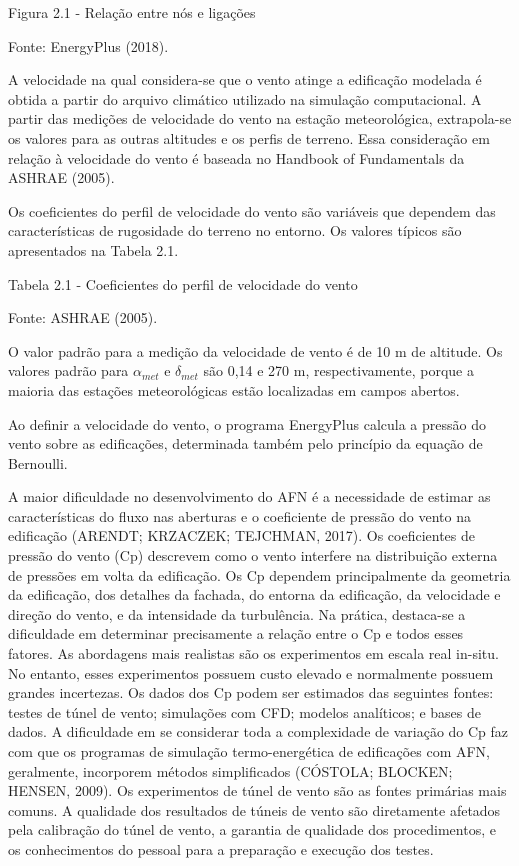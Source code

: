 \documentclass[brazil,hardcopy,openany,a5paper]{ufscthesis}
\begin{document}
	Figura 2.1 - Relação entre nós e ligações
	
	Fonte: EnergyPlus (2018).
	
	A velocidade na qual considera-se que o vento atinge a edificação modelada é obtida a partir do arquivo climático utilizado na simulação
	computacional. A partir das medições de velocidade do vento na estação meteorológica, extrapola-se os valores para as outras altitudes e os perfis de terreno. Essa consideração em relação à velocidade do vento é baseada no
	Handbook of Fundamentals da ASHRAE (2005).
	
	Os coeficientes do perfil de velocidade do vento são variáveis que dependem das características de rugosidade do terreno no entorno. Os valores típicos são apresentados na Tabela 2.1.
	
	Tabela 2.1 - Coeficientes do perfil de velocidade do vento 
	
	Fonte: ASHRAE (2005).
	
	O valor padrão para a medição da velocidade de vento é de 10 m de altitude. Os valores padrão para $\alpha_{met}$ e $\delta_{met}$ são 0,14 e 270 m, respectivamente, porque a maioria das estações meteorológicas estão localizadas em campos abertos.
	
	Ao definir a velocidade do vento, o programa EnergyPlus calcula a pressão do vento sobre as edificações, determinada também pelo princípio da equação de Bernoulli.
	
	A maior dificuldade no desenvolvimento do AFN é a necessidade de estimar as características do fluxo nas aberturas e o coeficiente de pressão do vento na edificação (ARENDT; KRZACZEK; TEJCHMAN, 2017). Os coeficientes de pressão do vento (Cp) descrevem como o vento interfere na distribuição externa de pressões em volta da edificação. Os Cp dependem principalmente da geometria da edificação, dos detalhes da fachada, do entorna da edificação, da velocidade e direção do vento, e da intensidade da turbulência. Na prática,
	destaca-se a dificuldade em determinar precisamente a relação entre o Cp e todos esses fatores. As abordagens mais realistas são os experimentos em escala real in-situ. No entanto, esses experimentos possuem custo elevado e normalmente possuem grandes incertezas. Os dados dos Cp podem ser estimados das seguintes fontes: testes de túnel de vento; simulações com CFD; modelos analíticos; e bases de dados.
	A dificuldade em se considerar toda a complexidade de variação do Cp faz com que os programas de simulação termo-energética de edificações com AFN, geralmente, incorporem métodos simplificados (CÓSTOLA; BLOCKEN; HENSEN, 2009). Os experimentos de túnel de vento são as fontes primárias mais comuns. A qualidade dos resultados de túneis de vento são diretamente afetados pela calibração do túnel de vento, a garantia de qualidade dos procedimentos, e os conhecimentos do pessoal para a preparação e execução dos testes.
	
\end{document}
